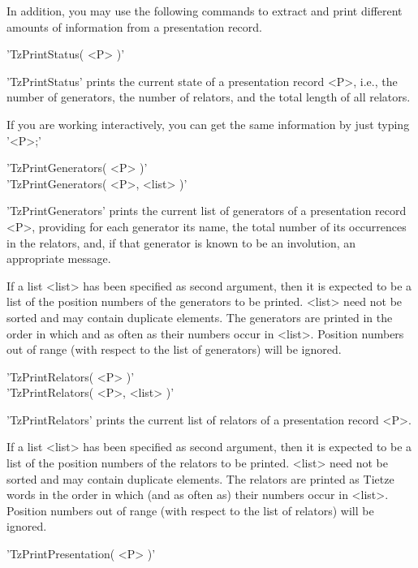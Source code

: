 In  addition, you may  use  the  following commands to extract and  print
different amounts of information from a presentation record.

\vspace{5mm}
'TzPrintStatus( <P> )'%

'TzPrintStatus'  prints the current  state of a presentation record  <P>,
i.e., the number of generators,  the  number of relators, and  the  total
length of all relators.

If  you are working  interactively,  you can get the same  information by
just typing '<P>;'

\vspace{5mm}
'TzPrintGenerators( <P> )'%
 \\
'TzPrintGenerators( <P>, <list> )'

'TzPrintGenerators'   prints  the  current  list  of   generators  of   a
presentation record <P>, providing for each generator its name, the total
number of its  occurrences in the relators,  and,  if  that generator  is
known to be an involution, an appropriate message.

If a  list  <list> has  been  specified as  second argument,  then  it is
expected to be  a list of the position  numbers  of  the generators to be
printed.  <list> need not be sorted and  may  contain duplicate elements.
The generators are printed in  the order in which and  as often as  their
numbers occur in <list>.  Position  numbers out of range (with respect to
the list of generators) will be ignored.

\vspace{5mm}
'TzPrintRelators( <P> )'%
 \\
'TzPrintRelators( <P>, <list> )'

'TzPrintRelators' prints the current list of relators  of  a presentation
record <P>.

If  a  list  <list>  has been specified  as  second argument, then it  is
expected  to  be a list  of the position numbers  of the  relators  to be
printed.  <list> need  not be sorted  and may contain duplicate elements.
The relators are printed as Tietze words in  the order  in  which (and as
often as)  their numbers occur in  <list>.  Position numbers out of range
(with respect to the list of relators) will be ignored.

\vspace{5mm}
'TzPrintPresentation( <P> )'%

